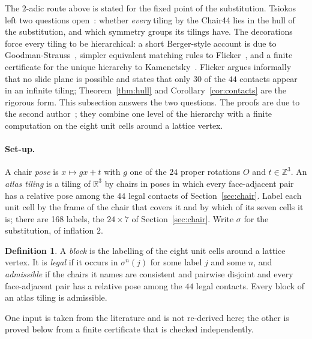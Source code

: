 \documentclass[11pt]{article}
\theoremstyle{definition}
\newtheorem{defn}{Definition}
\theoremstyle{remark}
\begin{document}
The $2$-adic route above is stated for the fixed point of the substitution.  Tsiokos left two questions open~\cite{Tsiokos1}:
whether \emph{every} tiling by the Chair44 lies in the hull of the substitution, and which symmetry groups its tilings
have.  The decorations force every tiling to be hierarchical: a short Berger-style account is due to
Goodman-Strauss~\cite{GoodmanStrauss}, simpler equivalent matching rules to Flicker~\cite{Flicker}, and a finite
certificate for the unique hierarchy to Kamenetsky~\cite{Kamenetsky}.  Flicker argues informally that no slide plane is
possible and states that only $30$ of the $44$ contacts appear in an infinite tiling; Theorem~\ref{thm:hull} and
Corollary~\ref{cor:contacts} are the rigorous form.  This subsection answers the two questions.  The proofs are due to the
second author~\cite{Romanov}; they combine one level of the hierarchy with a finite computation on the eight unit cells
around a lattice vertex.

\paragraph{Set-up.}  A chair \emph{pose} is $x\mapsto gx+t$ with $g$ one of the $24$ proper rotations $O$ and
$t\in\mathbb{Z}^{3}$.  An \emph{atlas tiling} is a tiling of $\mathbb{R}^{3}$ by chairs in poses in which every face-adjacent
pair has a relative pose among the $44$ legal contacts of Section~\ref{sec:chair}.  Label each unit cell by the frame of the
chair that covers it and by which of its seven cells it is; there are 168 labels, the $24\times7$ of
Section~\ref{sec:chair}.  Write $\sigma$ for the substitution, of inflation $2$.

\begin{defn}
\label{def:block}
A \emph{block} is the labelling of the eight unit cells around a lattice vertex.  It is \emph{legal} if it occurs in
$\sigma^{n}(j)$ for some label $j$ and some $n$, and \emph{admissible} if the chairs it names are consistent and pairwise
disjoint and every face-adjacent pair has a relative pose among the $44$ legal contacts.  Every block of an atlas tiling is
admissible.
\end{defn}

\noindent
One input is taken from the literature and is not re-derived here; the other is proved below from a finite
certificate that is checked independently.
\end{document}
